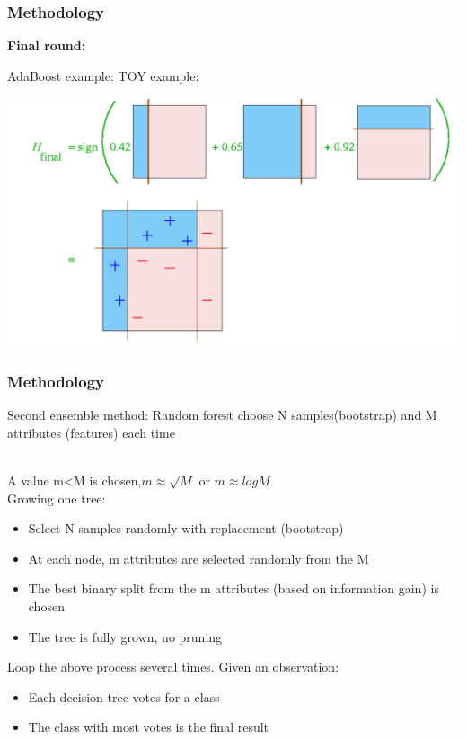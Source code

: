 \documentclass[xcolor={x11names,svgnames,dvipsnames}]{beamer}
\begin{document}
\begin{frame}
	\frametitle{Methodology}
			\small{\textbf{Final round:}}\\
			
	\begin{block}{AdaBoost example: TOY example:}

      \includegraphics[width=1\textwidth, height=0.6\textheight]{round_4.png}
	\end{block}	
\end{frame}




\begin{frame}
	\frametitle{Methodology}
		\begin{block}{Second ensemble method: Random forest}	
			\alert{ choose N samples(bootstrap) and M attributes (features) each time}
			
			\\
			A value m<M is chosen,$m \approx \sqrt{M} $ or $m \approx log{M}$\\
		Growing one tree:
		
		\begin{itemize}
		\item Select N samples randomly with replacement (bootstrap)\\
		\item At each node, m attributes are selected randomly from the M
		\item The best binary split from the m attributes (based on
		information gain) is chosen\\
		\item The tree is fully grown, no pruning		
		
		\end{itemize}
		Loop the above process several times. Given an observation:\\
		\begin{itemize}
		\item Each decision tree votes for a class\\
		\item The class with most votes is the final result\\		
		\end{itemize}	 
		\end{block}	
\end{frame}
\end{document}
